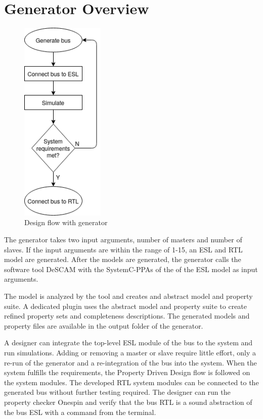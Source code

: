 \section{Generator Overview}
\begin{figure}
\includegraphics[width=4cm]{figs/Generator.png}
\caption{Design flow with generator}\label{fig:dflow}
\end{figure}  

The generator takes two input arguments, number of masters and number of slaves. If the input arguments are within the range of 1-15, an ESL and RTL model are generated. After the models are generated, the generator calls the software tool DeSCAM with the SystemC-PPAs of the of the ESL model as input arguments. \par The model is analyzed by the tool and creates and abstract model and property suite. A dedicated plugin uses the abstract model and property suite to create refined property sets and completeness descriptions. The generated models and property files are available in the output folder of the generator. \par A designer can integrate the top-level ESL module of the bus to the system and run simulations. Adding or removing a master or slave require little effort, only a re-run of the generator and a re-integration of the bus into the system. When the system fulfills the requirements, the Property Driven Design flow is followed on the system modules. The developed RTL system modules can be connected to the generated bus without further testing required. The designer can run the property checker Onespin and verify that the bus RTL is a sound abstraction of the bus ESL with a command from the terminal. \par

